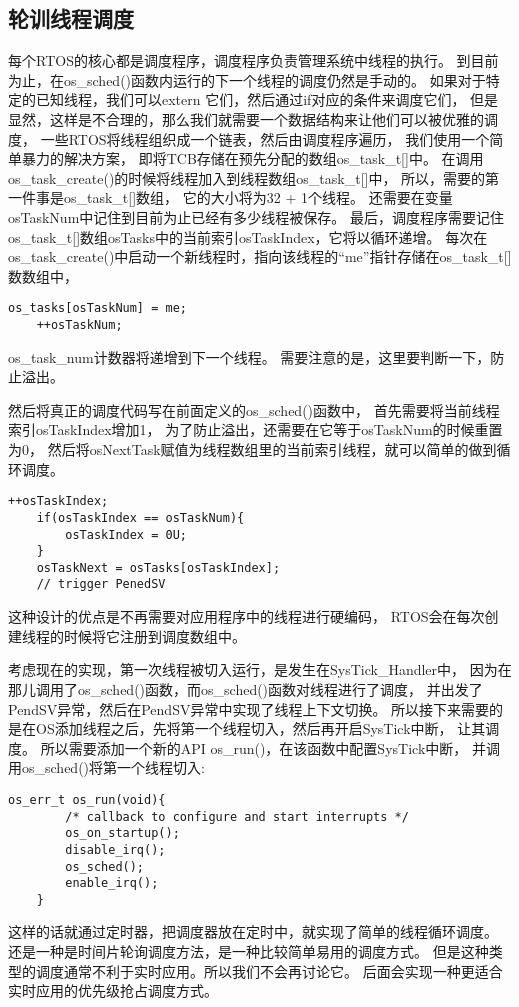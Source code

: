 \subsection{轮训线程调度}
每个RTOS的核心都是调度程序，调度程序负责管理系统中线程的执行。
到目前为止，在os\_sched()函数内运行的下一个线程的调度仍然是手动的。
如果对于特定的已知线程，我们可以extern 它们，然后通过if对应的条件来调度它们，
但是显然，这样是不合理的，那么我们就需要一个数据结构来让他们可以被优雅的调度，
一些RTOS将线程组织成一个链表，然后由调度程序遍历，
我们使用一个简单暴力的解决方案，
即将TCB存储在预先分配的数组os\_task\_t[]中。
在调用os\_task\_create()的时候将线程加入到线程数组os\_task\_t[]中，
所以，需要的第一件事是os\_task\_t[]数组，
它的大小将为32 + 1个线程。
还需要在变量osTaskNum中记住到目前为止已经有多少线程被保存。
最后，调度程序需要记住os\_task\_t[]数组osTasks中的当前索引osTaskIndex，它将以循环递增。
每次在os\_task\_create()中启动一个新线程时，指向该线程的“me”指针存储在os\_task\_t[]数数组中，
\begin{lstlisting}[language={[ANSI]C},keywordstyle=\color{blue!70},commentstyle=\color{red!50!green!50!blue!50},frame=shadowbox, rulesepcolor=\color{red!20!green!20!blue!20}]  
    os_tasks[osTaskNum] = me;
    ++osTaskNum;
\end{lstlisting}
os\_task\_num计数器将递增到下一个线程。
需要注意的是，这里要判断一下，防止溢出。

然后将真正的调度代码写在前面定义的os\_sched()函数中，
首先需要将当前线程索引osTaskIndex增加1，
为了防止溢出，还需要在它等于osTaskNum的时候重置为0，
然后将osNextTask赋值为线程数组里的当前索引线程，就可以简单的做到循环调度。
\begin{lstlisting}[language={[ANSI]C},keywordstyle=\color{blue!70},commentstyle=\color{red!50!green!50!blue!50},frame=shadowbox, rulesepcolor=\color{red!20!green!20!blue!20}]  
    ++osTaskIndex;
    if(osTaskIndex == osTaskNum){
        osTaskIndex = 0U;
    }
    osTaskNext = osTasks[osTaskIndex];
    // trigger PenedSV
\end{lstlisting}
这种设计的优点是不再需要对应用程序中的线程进行硬编码，
RTOS会在每次创建线程的时候将它注册到调度数组中。

考虑现在的实现，第一次线程被切入运行，是发生在SysTick\_Handler中，
因为在那儿调用了os\_sched()函数，而os\_sched()函数对线程进行了调度，
并出发了PendSV异常，然后在PendSV异常中实现了线程上下文切换。
所以接下来需要的是在OS添加线程之后，先将第一个线程切入，然后再开启SysTick中断，
让其调度。
所以需要添加一个新的API os\_run()，在该函数中配置SysTick中断，
并调用os\_sched()将第一个线程切入:
\begin{lstlisting}[language={[ANSI]C},keywordstyle=\color{blue!70},commentstyle=\color{red!50!green!50!blue!50},frame=shadowbox, rulesepcolor=\color{red!20!green!20!blue!20}]  
    os_err_t os_run(void){
        /* callback to configure and start interrupts */
        os_on_startup();
        disable_irq();
        os_sched();
        enable_irq();
    }
\end{lstlisting}
这样的话就通过定时器，把调度器放在定时中，就实现了简单的线程循环调度。
还是一种是时间片轮询调度方法，是一种比较简单易用的调度方式。
但是这种类型的调度通常不利于实时应用。所以我们不会再讨论它。
后面会实现一种更适合实时应用的优先级抢占调度方式。

